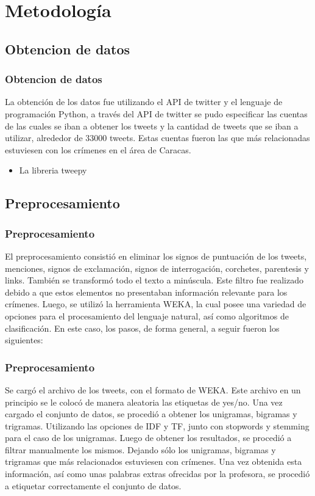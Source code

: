 \documentclass{beamer}
\newcommand\Fontvi{\fontsize{10}{7.2}\selectfont}
\begin{document}
\section{Metodolog\'{i}a}

\subsection{Obtencion de datos}
\begin{frame}
\frametitle{Obtencion de datos}
La obtenci\'{o}n de los datos fue utilizando el API de twitter y el lenguaje de programaci\'{o}n Python, a trav\'{e}s del API de twitter se pudo especificar las cuentas de las cuales se iban a obtener los tweets y la cantidad de tweets que se iban a utilizar, alrededor de 33000 tweets. Estas cuentas fueron las que m\'{a}s relacionadas estuviesen con los cr\'{i}menes en el \'{a}rea de Caracas.
\begin{itemize}
\item La libreria tweepy
\end{itemize}
\end{frame}


\subsection{Preprocesamiento}
\begin{frame}
\frametitle{Preprocesamiento}
El preprocesamiento consisti\'{o} en eliminar los signos de puntuaci\'{o}n de los tweets, menciones, signos de exclamaci\'{o}n, signos de interrogaci\'{o}n, corchetes, parentesis y links. Tambi\'{e}n se transform\'{o} todo el texto a minúscula. Este filtro fue realizado debido a que estos elementos no presentaban informaci\'{o}n relevante para los cr\'{i}menes. Luego, se utiliz\'{o} la herramienta WEKA, la cual posee una variedad de opciones para el procesamiento del lenguaje natural, as\'{i} como algoritmos de clasificaci\'{o}n. En este caso, los pasos, de forma general, a seguir fueron los siguientes:
\end{frame}

\begin{frame}
\frametitle{Preprocesamiento}
\Fontvi
Se carg\'{o} el archivo de los tweets, con el formato de WEKA. Este archivo en un principio se le coloc\'{o} de manera aleatoria las etiquetas de yes/no.
Una vez cargado el conjunto de datos, se procedi\'{o} a obtener los unigramas, bigramas y trigramas. Utilizando las opciones de IDF y TF, junto con stopwords y stemming para el caso de los unigramas.
Luego de obtener los resultados, se procedi\'{o} a filtrar manualmente los mismos. Dejando s\'{o}lo los unigramas, bigramas y trigramas que m\'{a}s relacionados estuviesen con cr\'{i}menes.
Una vez obtenida esta informaci\'{o}n, as\'{i} como unas palabras extras ofrecidas por la profesora, se procedi\'{o} a etiquetar correctamente el conjunto de datos.
\end{frame}
\end{document}
